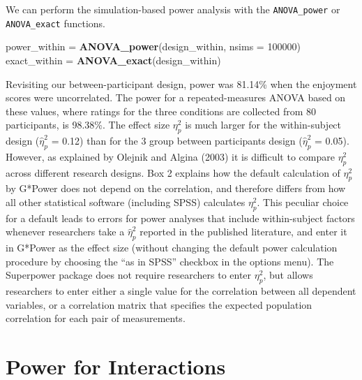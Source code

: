 \documentclass[
  english,
  ,jou,floatsintext]{apa6}
\newenvironment{Shaded}{\begin{snugshade}}{\end{snugshade}}
\newcommand{\DataTypeTok}[1]{\textcolor[rgb]{0.13,0.29,0.53}{#1}}
\newcommand{\DecValTok}[1]{\textcolor[rgb]{0.00,0.00,0.81}{#1}}
\newcommand{\KeywordTok}[1]{\textcolor[rgb]{0.13,0.29,0.53}{\textbf{#1}}}
\newcommand{\NormalTok}[1]{#1}
\newcommand{\StringTok}[1]{\textcolor[rgb]{0.31,0.60,0.02}{#1}}
\begin{document}
We can perform the simulation-based power analysis with the \texttt{ANOVA\_power} or \texttt{ANOVA\_exact} functions.

\begin{Shaded}
\begin{Highlighting}[]
\NormalTok{power_within =}\StringTok{ }\KeywordTok{ANOVA_power}\NormalTok{(design_within,}
                           \DataTypeTok{nsims =} \DecValTok{100000}\NormalTok{)}
\NormalTok{exact_within =}\StringTok{ }\KeywordTok{ANOVA_exact}\NormalTok{(design_within)}
\end{Highlighting}
\end{Shaded}

Revisiting our between-participant design, power was 81.14\% when the enjoyment scores were uncorrelated.
The power for a repeated-measures ANOVA based on these values, where ratings for the three conditions are collected from 80 participants, is 98.38\%.
The effect size \(\eta_p^2\) is much larger for the within-subject design (\(\hat\eta_p^2\) = 0.12) than for the 3 group between participants design (\(\hat\eta_p^2\) = 0.05).
However, as explained by Olejnik and Algina (2003) it is difficult to compare \(\eta_p^2\) across different research designs.
Box 2 explains how the default calculation of \(\eta_p^2\) by G*Power does not depend on the correlation, and therefore differs from how all other statistical software (including SPSS) calculates \(\eta_p^2\).
This peculiar choice for a default leads to errors for power analyses that include within-subject factors whenever researchers take a \(\hat\eta_p^2\) reported in the published literature, and enter it in G*Power as the effect size (without changing the default power calculation procedure by choosing the \enquote{as in SPSS} checkbox in the options menu).
The Superpower package does not require researchers to enter \(\eta_p^2\), but allows researchers to enter either a single value for the correlation between all dependent variables, or a correlation matrix that specifies the expected population correlation for each pair of measurements.

\hypertarget{power-for-interactions}{%
\section{Power for Interactions}\label{power-for-interactions}}
\end{document}
